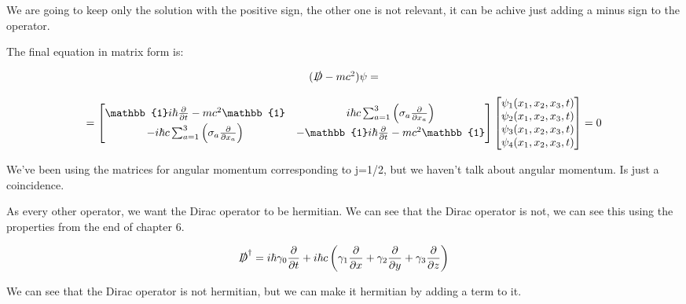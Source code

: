 We are going to keep only the solution with the positive sign, the other one is not relevant, it can be achive just adding a minus sign to the operator.


The final equation in matrix form is:

\begin{equation}
  \begin{array}{c}
    (\slashed{D}-mc^2)\psi =
    \\

    \\
    = \begin{bmatrix}
      \mathbb{1} i\hbar \frac{\partial }{\partial t} - mc^2 \mathbb{1} & i\hbar c\sum_{a=1}^{3}\left(\sigma_a\frac{\partial}{\partial x_a}\right)\\
      -i\hbar c\sum_{a=1}^{3}\left(\sigma_a\frac{\partial}{\partial x_a}\right) & -\mathbb{1} i\hbar \frac{\partial }{\partial t} - mc^2 \mathbb{1}
    \end{bmatrix}\begin{bmatrix}
      \psi_1(x_1,x_2,x_3,t)\\
      \psi_2(x_1,x_2,x_3,t)\\
      \psi_3(x_1,x_2,x_3,t)\\
      \psi_4(x_1,x_2,x_3,t)
    \end{bmatrix} = 0
  \end{array}
\end{equation}

We've been using the matrices for angular momentum corresponding to j=1/2, but we haven't talk about angular momentum. Is just a coincidence.

As every other operator, we want the Dirac operator to be hermitian. We can see that the Dirac operator is not, we can see this using the properties from the end of chapter 6.

\begin{equation}
  \slashed{D}^{\dagger} = i\hbar \gamma_0 \frac{\partial}{\partial t} + i\hbar c \left(\gamma_1 \frac{\partial}{\partial x}+\gamma_2 \frac{\partial}{\partial y}+\gamma_3 \frac{\partial}{\partial z}\right)
\end{equation}

We can see that the Dirac operator is not hermitian, but we can make it hermitian by adding a term to it.

